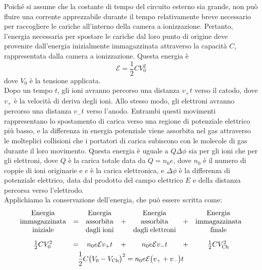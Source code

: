 \begin{approfondimento}
\begin{figure}[H]
   \end{figure}
   Poiché si assume che la costante di tempo del circuito esterno sia grande, non può fluire una corrente apprezzabile durante il tempo relativamente breve necessario per raccogliere le cariche all'interno della camera a ionizzazione. Pertanto, l'energia necessaria per spostare le cariche dal loro punto di origine deve provenire dall'energia inizialmente immagazzinata attraverso la capacità $C$, rappresentata dalla camera a ionizzazione. Questa energia è
   \begin{equation*}
      \mathcal{E}=\frac{1}{2}CV_0^2
   \end{equation*}
   dove $V_0$ è la tensione applicata.\\
   Dopo un tempo $t$, gli ioni avranno percorso una distanza $v_{+}t$ verso il catodo, dove $v_{+} $ è la velocità di deriva degli ioni. Allo stesso modo, gli elettroni avranno percorso una distanza $v_{-}t$ verso l'anodo. Entrambi questi movimenti rappresentano lo spostamento di carica verso una regione di potenziale elettrico più basso, e la differenza in energia potenziale viene assorbita nel gas attraverso le molteplici collisioni che i portatori di carica subiscono con le molecole di gas durante il loro movimento. Questa energia è uguale a $Q \Delta\phi$ sia per gli ioni che per gli elettroni, dove $Q$ è la carica totale data da $Q=n_0e$, dove $n_0$ è il numero di coppie di ioni originarie e $e$ è la carica elettronica, e $\Delta\phi$ è la differenza di potenziale elettrico, data dal prodotto del campo elettrico $E$ e della distanza percorsa verso l'elettrodo.\\
   Applichiamo la conservazione dell'energia, che può essere scritta come:
   \begin{gather*}
      \begin{array}{ccccccc}
         \rm Energia &  & \rm Energia &  & \rm Energia & & \rm Energia\\
         \rm immagazzinata & = & \rm assorbita & + & \rm assorbita & + & \rm immagazzinata\\
         \rm iniziale &  & \rm dagli \; ioni &  & \rm dagli \; elettroni &  & \rm finale\\[0.3cm]
         \frac{1}{2}CV_0^2 & = & n_0 e \mathcal{E} v_{+} t & + & n_0 e \mathcal{E} v_{-} t & + & \frac{1}{2}CV_{\rm Ch}^2
      \end{array}
      \\
      \frac{1}{2}C \bigl( V_0 - V_{\rm Ch} \bigr)^2
      =n_0 e \mathcal{E} \bigl( v_{+} + v_{-} \bigr) t
      \\

\end{gather*}
\end{approfondimento}
